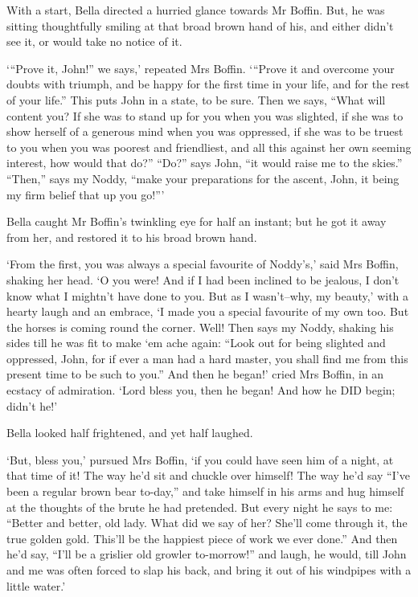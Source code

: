 With a start, Bella directed a hurried glance towards Mr Boffin. But,
he was sitting thoughtfully smiling at that broad brown hand of his, and
either didn’t see it, or would take no notice of it.

‘“Prove it, John!” we says,’ repeated Mrs Boffin. ‘“Prove it and
overcome your doubts with triumph, and be happy for the first time in
your life, and for the rest of your life.” This puts John in a state,
to be sure. Then we says, “What will content you? If she was to stand up
for you when you was slighted, if she was to show herself of a generous
mind when you was oppressed, if she was to be truest to you when you was
poorest and friendliest, and all this against her own seeming interest,
how would that do?” “Do?” says John, “it would raise me to the skies.”
 “Then,” says my Noddy, “make your preparations for the ascent, John, it
being my firm belief that up you go!”’

Bella caught Mr Boffin’s twinkling eye for half an instant; but he got
it away from her, and restored it to his broad brown hand.

‘From the first, you was always a special favourite of Noddy’s,’ said
Mrs Boffin, shaking her head. ‘O you were! And if I had been inclined
to be jealous, I don’t know what I mightn’t have done to you. But as I
wasn’t--why, my beauty,’ with a hearty laugh and an embrace, ‘I made you
a special favourite of my own too. But the horses is coming round the
corner. Well! Then says my Noddy, shaking his sides till he was fit to
make ‘em ache again: “Look out for being slighted and oppressed, John,
for if ever a man had a hard master, you shall find me from this present
time to be such to you.” And then he began!’ cried Mrs Boffin, in an
ecstacy of admiration. ‘Lord bless you, then he began! And how he DID
begin; didn’t he!’

Bella looked half frightened, and yet half laughed.

‘But, bless you,’ pursued Mrs Boffin, ‘if you could have seen him of a
night, at that time of it! The way he’d sit and chuckle over himself!
The way he’d say “I’ve been a regular brown bear to-day,” and take
himself in his arms and hug himself at the thoughts of the brute he had
pretended. But every night he says to me: “Better and better, old lady.
What did we say of her? She’ll come through it, the true golden gold.
This’ll be the happiest piece of work we ever done.” And then he’d say,
“I’ll be a grislier old growler to-morrow!” and laugh, he would, till
John and me was often forced to slap his back, and bring it out of his
windpipes with a little water.’

